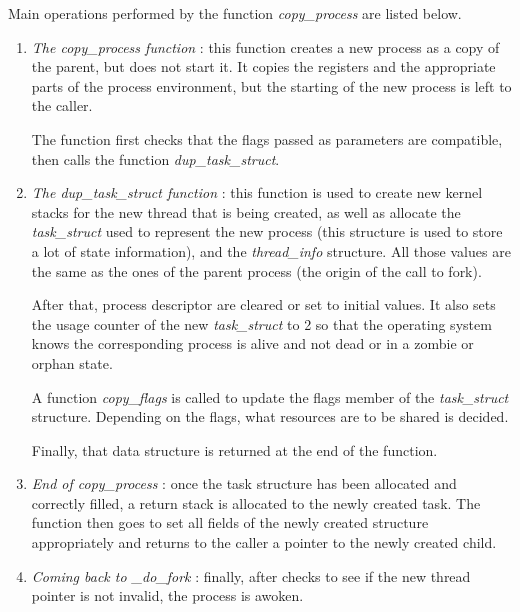 \documentclass[a4paper, 12pt]{article}
\begin{document}
    Main operations performed by the function \emph{copy\_process} are listed below.
    
    \begin{enumerate}
        \item \emph{The copy\_process function} : this function creates a new process as a copy of the parent, but does not start it. It copies the registers and the appropriate parts of the process environment, but the starting of the new process is left to the caller.
        
        The function first checks that the flags passed as parameters are compatible, then calls the function \emph{dup\_task\_struct}.
        
        \item\label{memory.step} \emph{The dup\_task\_struct function} : this function is used to create new kernel stacks for the new thread that is being created, as well as allocate the \emph{task\_struct} used to represent the new process (this structure is used to store a lot of state information), and the \emph{thread\_info} structure. All those values are the same as the ones of the parent process (the origin of the call to fork).
        
        After that, process descriptor are cleared or set to initial values. It also sets the usage counter of the new \emph{task\_struct} to 2 so that the operating system knows the corresponding process is alive and not dead or in a zombie or orphan state.
        
        A function \emph{copy\_flags} is called to update the flags member of the \emph{task\_struct} structure. Depending on the flags, what resources are to be shared is decided.
        
        Finally, that data structure is returned at the end of the function.
        
        \item \emph{End of copy\_process} : once the task structure has been allocated and correctly filled, a return stack is allocated to the newly created task. The function then goes to set all fields of the newly created structure appropriately and returns to the caller a pointer to the newly created child.
        
        \item \emph{Coming back to \_do\_fork} : finally, after checks to see if the new thread pointer is not invalid, the process is awoken.
    \end{enumerate}
    
\end{document}
